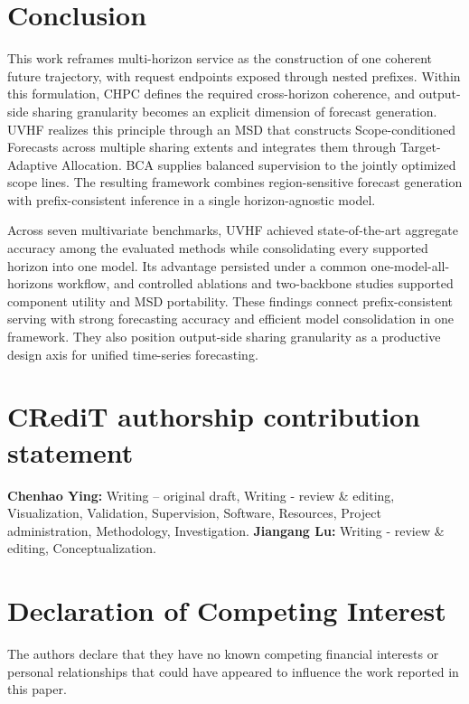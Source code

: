 \documentclass[final,3p,times]{elsarticle}
\newif\ifshowrevisions
\newcommand{\rev}[1]{\ifshowrevisions\textcolor{revisionblue}{#1}\else#1\fi}
\begin{document}
\section{Conclusion}
\label{sec:conclusion}


This work reframes multi-horizon service as the construction of one coherent future trajectory, with request endpoints exposed through nested prefixes. Within this formulation, CHPC defines the required cross-horizon coherence, and output-side sharing granularity becomes an explicit dimension of forecast generation. \rev{UVHF realizes this principle through an MSD that constructs Scope-conditioned Forecasts across multiple sharing extents and integrates them through Target-Adaptive Allocation. BCA supplies balanced supervision to the jointly optimized scope lines.} The resulting framework combines region-sensitive forecast generation with prefix-consistent inference in a single horizon-agnostic model.

Across seven multivariate benchmarks, \rev{UVHF} achieved state-of-the-art aggregate accuracy among the evaluated methods while consolidating every supported horizon into one model. Its advantage persisted under a common one-model-all-horizons workflow, and controlled ablations and two-backbone studies supported component utility and \rev{MSD portability}. These findings connect prefix-consistent serving with strong forecasting accuracy and efficient model consolidation in one framework. They also position output-side sharing granularity as a productive design axis for unified time-series forecasting.

\section*{CRediT authorship contribution statement}
\indent \textbf{Chenhao Ying:} Writing -- original draft, Writing - review \& editing, Visualization, Validation, Supervision, Software, Resources, Project administration, Methodology, Investigation. \textbf{Jiangang Lu:} Writing - review \& editing, Conceptualization.

\section*{Declaration of Competing Interest}
\indent The authors declare that they have no known competing financial interests or personal relationships that could have appeared to influence the work reported in this paper.
\end{document}
